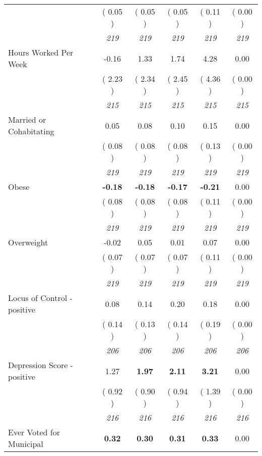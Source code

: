 \begin{tabular}{l c c c c c}
& (     0.05 ) & (     0.05 ) & (     0.05 ) & (     0.11 ) & (     0.00 ) \\
& \textit{ 219 } & \textit{ 219 } & \textit{ 219 } & \textit{ 219 } & \textit{ 219 } \\
Hours Worked Per Week &     -0.16 &      1.33 &      1.74 &      4.28 &      0.00 \\
& (     2.23 ) & (     2.34 ) & (     2.45 ) & (     4.36 ) & (     0.00 ) \\
& \textit{ 215 } & \textit{ 215 } & \textit{ 215 } & \textit{ 215 } & \textit{ 215 } \\
Married or Cohabitating &      0.05 &      0.08 &      0.10 &      0.15 &      0.00 \\
& (     0.08 ) & (     0.08 ) & (     0.08 ) & (     0.13 ) & (     0.00 ) \\
& \textit{ 219 } & \textit{ 219 } & \textit{ 219 } & \textit{ 219 } & \textit{ 219 } \\
Obese & \textbf{     -0.18 } & \textbf{     -0.18 } & \textbf{     -0.17 } & \textbf{    -0.21} &      0.00 \\
& (     0.08 ) & (     0.08 ) & (     0.08 ) & (     0.11 ) & (     0.00 ) \\
& \textit{ 219 } & \textit{ 219 } & \textit{ 219 } & \textit{ 219 } & \textit{ 219 } \\
Overweight &     -0.02 &      0.05 &      0.01 &      0.07 &      0.00 \\
& (     0.07 ) & (     0.07 ) & (     0.07 ) & (     0.11 ) & (     0.00 ) \\
& \textit{ 219 } & \textit{ 219 } & \textit{ 219 } & \textit{ 219 } & \textit{ 219 } \\
Locus of Control - positive &      0.08 &      0.14 &      0.20 &      0.18 &      0.00 \\
& (     0.14 ) & (     0.13 ) & (     0.14 ) & (     0.19 ) & (     0.00 ) \\
& \textit{ 206 } & \textit{ 206 } & \textit{ 206 } & \textit{ 206 } & \textit{ 206 } \\
Depression Score - positive &      1.27 & \textbf{      1.97 } & \textbf{      2.11 } & \textbf{     3.21} &      0.00 \\
& (     0.92 ) & (     0.90 ) & (     0.94 ) & (     1.39 ) & (     0.00 ) \\
& \textit{ 216 } & \textit{ 216 } & \textit{ 216 } & \textit{ 216 } & \textit{ 216 } \\
Ever Voted for Municipal & \textbf{      0.32 } & \textbf{      0.30 } & \textbf{      0.31 } & \textbf{     0.33} &      0.00 \\

\end{tabular}
